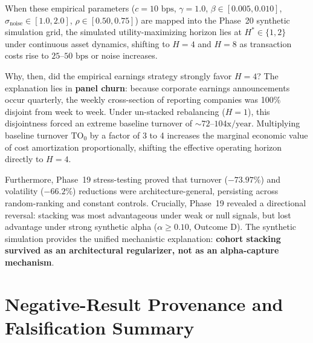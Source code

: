 \documentclass[11pt,a4paper]{article}
\theoremstyle{definition}
\begin{document}
When these empirical parameters ($c = 10\text{ bps}$, $\gamma = 1.0$, $\beta \in [0.005, 0.010]$, $\sigma_{\text{noise}} \in [1.0, 2.0]$, $\rho \in [0.50, 0.75]$) are mapped into the Phase~20 synthetic simulation grid, the simulated utility-maximizing horizon lies at $H^* \in \{1, 2\}$ under continuous asset dynamics, shifting to $H=4$ and $H=8$ as transaction costs rise to $25\text{--}50\text{ bps}$ or noise increases.

Why, then, did the empirical earnings strategy strongly favor $H=4$? The explanation lies in \textbf{panel churn}: because corporate earnings announcements occur quarterly, the weekly cross-section of reporting companies was 100\% disjoint from week to week. Under un-stacked rebalancing ($H=1$), this disjointness forced an extreme baseline turnover of $\sim 72\text{--}104\text{x/year}$. Multiplying baseline turnover $\text{TO}_0$ by a factor of 3 to 4 increases the marginal economic value of cost amortization proportionally, shifting the effective operating horizon directly to $H=4$.

Furthermore, Phase~19 stress-testing proved that turnover ($-73.97\%$) and volatility ($-66.2\%$) reductions were architecture-general, persisting across random-ranking and constant controls. Crucially, Phase~19 revealed a directional reversal: stacking was most advantageous under weak or null signals, but lost advantage under strong synthetic alpha ($\alpha \ge 0.10$, Outcome D). The synthetic simulation provides the unified mechanistic explanation: \textbf{cohort stacking survived as an architectural regularizer, not as an alpha-capture mechanism}.


\section{Negative-Result Provenance and Falsification Summary}
\label{sec:provenance}
\end{document}

